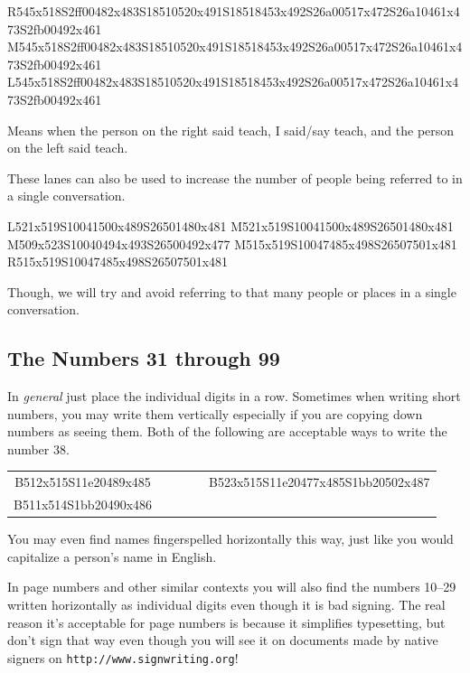 \documentclass{article}
\begin{document}
\begin{center}
R545x518S2ff00482x483S18510520x491S18518453x492S26a00517x472S26a10461x473S2fb00492x461
M545x518S2ff00482x483S18510520x491S18518453x492S26a00517x472S26a10461x473S2fb00492x461
L545x518S2ff00482x483S18510520x491S18518453x492S26a00517x472S26a10461x473S2fb00492x461
\end{center}

Means when the person on the right said teach, I said/say teach, and the person on the left said teach.

These lanes can also be used to increase the number of people being referred to in a single conversation.

\begin{center}
L521x519S10041500x489S26501480x481
M521x519S10041500x489S26501480x481
M509x523S10040494x493S26500492x477
M515x519S10047485x498S26507501x481
R515x519S10047485x498S26507501x481
\end{center}

Though, we will try and avoid referring to that many people or places in a single conversation.

\subsection{The Numbers 31 through 99}

In \emph{general} just place the individual digits in a row.
Sometimes when writing short numbers, you may write them vertically especially if you are copying down numbers as seeing them.
Both of the following are acceptable ways to write the number 38.

\begin{center}
\begin{tabular}{*{3}{c}}
B512x515S11e20489x485&\ \ \ \ \ &B523x515S11e20477x485S1bb20502x487\\
B511x514S1bb20490x486\\
\end{tabular}
\end{center}

You may even find names fingerspelled horizontally this way, just like you would capitalize a person's name in English.

In page numbers and other similar contexts you will also find the numbers 10--29 written horizontally as individual digits even though it is bad signing.
The real reason it's acceptable for page numbers is because it simplifies typesetting, but don't sign that way even though you will see it on documents made by native signers on \texttt{http://www.signwriting.org}!
\end{document}
